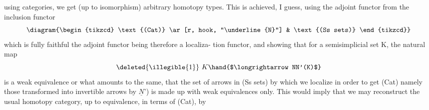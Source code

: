 using categories, we get (up to isomorphism) arbitrary homotopy types.
This is achieved, I guess, using the  adjoint functor  from the
inclusion functor
\[ \diagram{\begin{tikzcd} \text{(Cat)} \ar[r, hook, "\underline{N}"] & \text{(Ss sets)} \end{tikzcd}} \]
which is fully faithful \hand{(}the adjoint functor being therefore a localiza-%
tion functor\hand{)}, and showing that for a semisimplicial set K, the natural
map
\[ \deleted{\illegible{1}}\ K \hand{$\longrightarrow NN'(K)$} \]
is a weak equivalence\hand{\unsure{;|,}} or what amounts to the same, that the set of
arrows in (Ss sets) by which we localize in order to get (Cat) \hand{(}namely
those transformed into invertible arrows by $\underline{N}$')  is made up with
weak equivalences only. This would imply that we may reconstruct the
usual homotopy category, up to equivalence, in terms of (Cat), by
